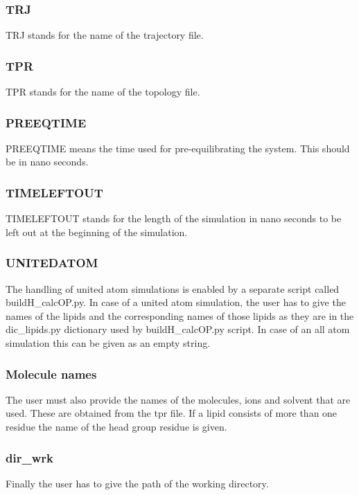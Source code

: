 \documentclass[12pt,a4paper]{article}
\begin{document}
\subsubsection*{TRJ}
TRJ stands for the name of the trajectory file.
\subsubsection*{TPR}
TPR stands for the name of the topology file.
\subsubsection*{PREEQTIME}
PREEQTIME means the time used for pre-equilibrating the system. This should be in nano seconds.
\subsubsection*{TIMELEFTOUT}
TIMELEFTOUT stands for the length of the simulation in nano seconds to be left out at the beginning of the simulation.
\subsubsection*{UNITEDATOM}
The handling of united atom simulations is enabled by a separate script called buildH\_calcOP.py. In case of a united atom simulation, the user has to give the names of the lipids and the corresponding names of those lipids as they are in the dic\_lipids.py dictionary used by buildH\_calcOP.py script. In case of an all atom simulation this can be given as an empty string.

\subsubsection*{Molecule names}
The user must also provide the names of the molecules, ions and solvent that are used. These are obtained from the tpr file. If a lipid consists of more than one residue the name of the head group residue is given.
\subsubsection*{dir\_wrk}
Finally the user has to give the path of the working directory.
\end{document}
